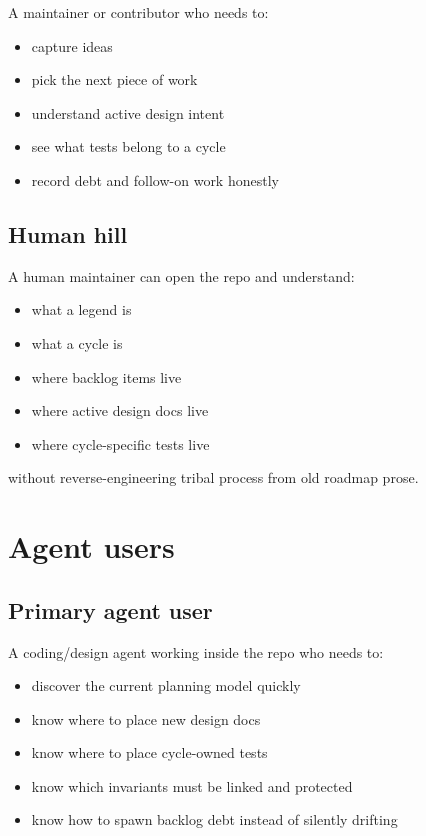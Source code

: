 A maintainer or contributor who needs to:

\begin{itemize}
\tightlist
\item
  capture ideas
\item
  pick the next piece of work
\item
  understand active design intent
\item
  see what tests belong to a cycle
\item
  record debt and follow-on work honestly
\end{itemize}

\subsection{Human hill}\label{record-200-human-hill}

A human maintainer can open the repo and understand:

\begin{itemize}
\tightlist
\item
  what a legend is
\item
  what a cycle is
\item
  where backlog items live
\item
  where active design docs live
\item
  where cycle-specific tests live
\end{itemize}

without reverse-engineering tribal process from old roadmap prose.

\section{Agent users}\label{record-200-agent-users}

\subsection{Primary agent user}\label{record-200-primary-agent-user}

A coding/design agent working inside the repo who needs to:

\begin{itemize}
\tightlist
\item
  discover the current planning model quickly
\item
  know where to place new design docs
\item
  know where to place cycle-owned tests
\item
  know which invariants must be linked and protected
\item
  know how to spawn backlog debt instead of silently drifting
\end{itemize}

